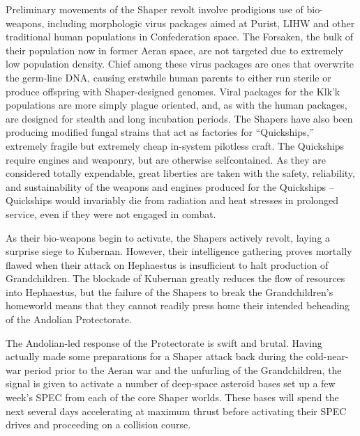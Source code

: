 Preliminary movements of the Shaper revolt involve prodigious use of bio-weapons, including morphologic virus packages aimed at Purist, LIHW and other traditional human populations in Confederation space. The Forsaken, the bulk of their population now in former Aeran space, are not targeted due to extremely low population density. Chief among these virus packages are ones that overwrite the germ-line DNA, causing erstwhile human parents to either run sterile or produce offspring with Shaper-designed genomes. Viral packages for the Klk’k populations are more simply plague oriented, and, as with the human packages, are designed for stealth and long incubation periods. The Shapers have also been producing modified fungal strains that act as factories for “Quickships,” extremely fragile but extremely cheap in-system pilotless craft. The Quickships require engines and weaponry, but are otherwise selfcontained. As they are considered totally expendable, great liberties are taken with the safety, reliability, and sustainability of the weapons and engines produced for the Quickships – Quickships would invariably die from radiation and heat stresses in prolonged service, even if they were not engaged in combat.

As their bio-weapons begin to activate, the Shapers actively revolt, laying a surprise siege to Kubernan. However, their intelligence gathering proves mortally flawed when their attack on Hephaestus is insufficient to halt production of Grandchildren. The blockade of Kubernan greatly reduces the flow of resources into Hephaestus, but the failure of the Shapers to break the Grandchildren’s homeworld means that they cannot readily press home their intended beheading of the Andolian Protectorate. 

The Andolian-led response of the Protectorate is swift and brutal. Having actually made some preparations for a Shaper attack back during the cold-near-war period prior to the Aeran war and the unfurling of the Grandchildren, the signal is given to activate a number of deep-space asteroid bases set up a few week’s SPEC from each of the core Shaper worlds. These bases will spend the next several days accelerating at maximum thrust before activating their SPEC drives and proceeding on a collision course.

